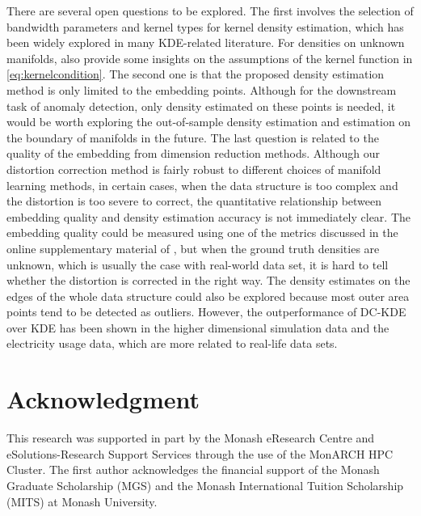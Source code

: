 \documentclass[12pt]{article}
\begin{document}
There are several open questions to be explored. The first involves the selection of bandwidth parameters and kernel types for kernel density estimation, which has been widely explored in many KDE-related literature. For densities on unknown manifolds, \textcite{Berenfeld2021-as} also provide some insights on the assumptions of the kernel function in \eqref{eq:kernelcondition}. The second one is that the proposed density estimation method is only limited to the embedding points. Although for the downstream task of anomaly detection, only density estimated on these points is needed, it would be worth exploring the out-of-sample density estimation and estimation on the boundary of manifolds \autocite{Berry2017-rz} in the future.
The last question is related to the quality of the embedding from dimension reduction methods. Although our distortion correction method is fairly robust to different choices of manifold learning methods, in certain cases, when the data structure is too complex and the distortion is too severe to correct, the quantitative relationship between embedding quality and density estimation accuracy is not immediately clear. The embedding quality could be measured using one of the metrics discussed in the online supplementary material of \textcite{Cheng2021-dh}, but when the ground truth densities are unknown, which is usually the case with real-world data set, it is hard to tell whether the distortion is corrected in the right way. The density estimates on the edges of the whole data structure could also be explored because most outer area points tend to be detected as outliers. However, the outperformance of DC-KDE over KDE has been shown in the higher dimensional simulation data and the electricity usage data, which are more related to real-life data sets.

\hypertarget{acknowledgment}{%
\section*{Acknowledgment}\label{acknowledgment}}

This research was supported in part by the Monash eResearch Centre and eSolutions-Research Support Services through the use of the MonARCH HPC Cluster. The first author acknowledges the financial support of the Monash Graduate Scholarship (MGS) and the Monash International Tuition Scholarship (MITS) at Monash University.

\clearpage

\appendix
\end{document}
